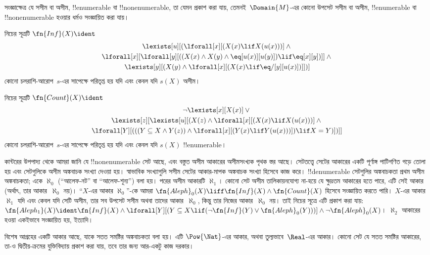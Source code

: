 \documentclass[../../../include/open-logic-section]{subfiles}
\begin{document}


\begin{explain}
সংজ্ঞাক্ষেত্র যে সসীম বা অসীম, !!{enumerable} বা !!{nonenumerable}, তা যেমন
প্রকাশ করা যায়, তেমনই~$\Domain{M}$-এর কোনো উপসেট সসীম বা অসীম,
!!{enumerable} বা !!{nonenumerable} হওয়ার ধর্মও সংজ্ঞায়িত করা যায়।
\end{explain}

\begin{prop}
নিচের সূত্রটি $\fn{Inf}(X) \ident$
\begin{multline*}
\lexists[u][(\lforall[x][(X(x) \lif X(u(x)))] \land {}\\
  \lforall[x][\lforall[y][((X(x) \land X(y) \land
      \eq[u(x)][u(y)]) \lif \eq[x][y])]] \land {}\\
  \lexists[y][(X(y) \land \lforall[x][(X(x)
      \lif \eq/[y][u(x)])]])]
\end{multline*}
কোনো চলরাশি-আরোপ~$s$-এর সাপেক্ষে পরিতৃপ্ত হয় যদি এবং কেবল যদি $s(X)$
অসীম।
\end{prop}

\begin{prop}
নিচের সূত্রটি $\fn{Count}(X) \ident $
\begin{multline*}
\lnot\lexists[x][X(x)] \lor {}\\
\lexists[z][\lexists[u][(X(z) \land
    \lforall[x][(X(x) \lif X(u(x)))] \land {}\\
    \lforall[Y][(((Y \subseteq X \land Y(z)) \land
      \lforall[x][(Y(x) \lif Y(u(x)))]) \lif X = Y)])]]
\end{multline*}
কোনো চলরাশি-আরোপ~$s$-এর সাপেক্ষে পরিতৃপ্ত হয় যদি এবং কেবল যদি $s(X)$
!!{enumerable}।
\end{prop}

কান্টরের উপপাদ্য থেকে আমরা জানি যে !!{nonenumerable} সেট আছে, এবং বস্তুত
অসীম আকারের অসীমসংখ্যক পৃথক স্তর আছে। সেটতত্ত্বে সেটের আকারের একটি
পূর্ণাঙ্গ পাটিগণিত গড়ে তোলা হয় এবং সেটগুলিকে অসীম অঙ্কবাচক সংখ্যা দেওয়া
হয়। স্বাভাবিক সংখ্যাগুলি সসীম সেটের আকার-মাপক অঙ্কবাচক সংখ্যা হিসেবে কাজ
করে। !!{denumerable} সেটগুলির অঙ্কবাচকতা প্রথম অসীম অঙ্কবাচকতা; একে
$\aleph_0$ (``আলেফ-নট'' বা ``আলেফ-শূন্য'') বলা হয়। পরের অসীম আকারটি
$\aleph_1$। কোনো সেট অসীম তালিকায়নযোগ্য না-হয়ে যে ক্ষুদ্রতম আকারের হতে
পারে, এটি সেই আকার (অর্থাৎ, তার আকার~$\aleph_0$ নয়)। ``$X$-এর আকার
$\aleph_0$''-কে আমরা $\fn{Aleph}_0(X) \liff \fn{Inf}(X) \land
\fn{Count}(X)$ হিসেবে সংজ্ঞায়িত করতে পারি। $X$-এর আকার~$\aleph_1$ যদি
এবং কেবল যদি সেটি অসীম, তার সব উপসেট সসীম অথবা তাদের আকার~$\aleph_0$,
কিন্তু তার নিজের আকার~$\aleph_0$ নয়। তাই নিচের সূত্রে এটি প্রকাশ করা যায়:
$\fn{Aleph_1}(X) \ident \fn{Inf}(X) \land
\lforall[Y][(Y \subseteq X \lif
  (\lnot\fn{Inf}(Y) \lor \fn{Aleph}_0(Y)))] \land \lnot
\fn{Aleph}_0(X)$।
$\aleph_2$ আকারের হওয়া একইভাবে সংজ্ঞায়িত হয়, ইত্যাদি।

বিশেষ আগ্রহের একটি আকার আছে, যাকে সতত সমষ্টির অঙ্কবাচকতা বলা হয়। এটি
$\Pow{\Nat}$-এর আকার, অথবা তুল্যভাবে~$\Real$-এর আকার। কোনো সেট যে সতত
সমষ্টির আকারের, তা-ও দ্বিতীয়-ক্রমের যুক্তিবিদ্যায় প্রকাশ করা যায়, তবে
তার জন্য আর-একটু কাজ দরকার।
\end{document}

